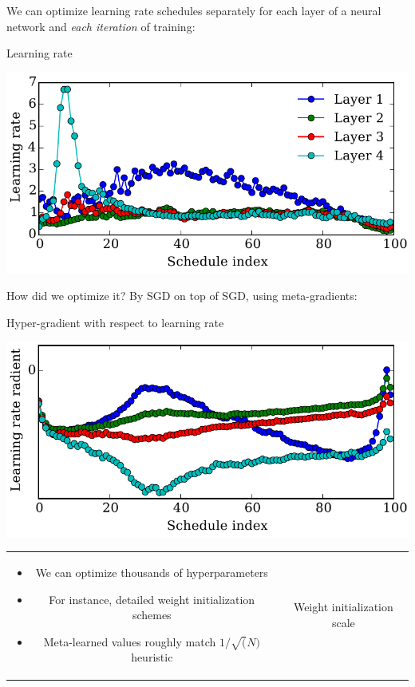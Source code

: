 \documentclass[landscape,a0b,final,a4resizeable]{include/a0poster}
\begin{document}
\begin{poster}
\begin{multicols}{3}

We can optimize learning rate schedules separately for each layer of a neural network and \emph{each iteration} of training:
\begin{center}
Learning rate

\includegraphics[width=0.7\columnwidth]{../experiments/Feb_3_training_schedules/3_adam_50/schedules_small.pdf}
\end{center}

How did we optimize it?  By SGD on top of SGD, using meta-gradients:

\begin{center}
Hyper-gradient with respect to learning rate

\includegraphics[width=0.7\columnwidth]{../experiments/Feb_3_training_schedules/5_initial_gradient/schedules_small.pdf}
\end{center}


\newpage %




\begin{tabular}{cc}
\begin{minipage}[c]{0.6\columnwidth}
\begin{itemize}
  \item We can optimize thousands of hyperparameters
  \item For instance, detailed weight initialization schemes
  \item Meta-learned values roughly match $1 / \sqrt(N)$ heuristic
\end{itemize}
\end{minipage} & 
\begin{minipage}[c]{0.4\columnwidth}
\begin{center}
Weight initialization scale


\end{center}
\end{minipage}
\end{tabular}
\end{multicols}
\end{poster}
\end{document}
